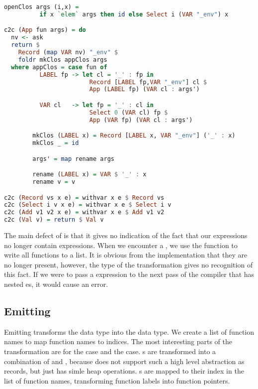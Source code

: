 {\begin{lstlisting}[language=Haskell]
        openClos args (i,x) =
          if x `elem` args then id else Select i (VAR "_env") x

c2c (App fun args) = do
  nv <- ask
  return $
    Record (map VAR nv) "_env" $
    foldr mkClos appClos args
  where appClos = case fun of
          LABEL fp -> let cl = '_' : fp in
                        Record [LABEL fp,VAR "_env"] cl $
                        App (LABEL fp) (VAR cl : args')

          VAR cl   -> let fp = '_' : cl in
                        Select 0 (VAR cl) fp $
                        App (VAR fp) (VAR cl : args')

        mkClos (LABEL x) = Record [LABEL x, VAR "_env"] ('_' : x)
        mkClos _ = id

        args' = map rename args

        rename (LABEL x) = VAR $ '_' : x
        rename v = v

c2c (Record vs x e) = withvar x e $ Record vs
c2c (Select i v x e) = withvar x e $ Select i v
c2c (Add v1 v2 x e) = withvar x e $ Add v1 v2
c2c (Val v) = return $ Val v
\end{lstlisting}

The main defect of  is that it gives no indication of the fact that our  expressions no longer contain  expressions. When we encounter a , we use the  function to write all functions to a list. It is obvious from the implementation that they are no longer present, however, the type  of the transformation gives no recognition of this fact. If we were to pass a  expression to the next pass of the compiler that has nested es, it would cause an error.

\subsection{\label{section:emit}Emitting}
Emitting transforms the  data type into the  data type. We create a list of function names  to map function names to indices. The most interesting parts of the transformation are for the  case and the  case. s are transformed into a combination of  and , because  does not support such a high level abstraction as records, but just has simle heap operations. s are mapped to their index in the list of function names, transforming function labels into function pointers.

}
